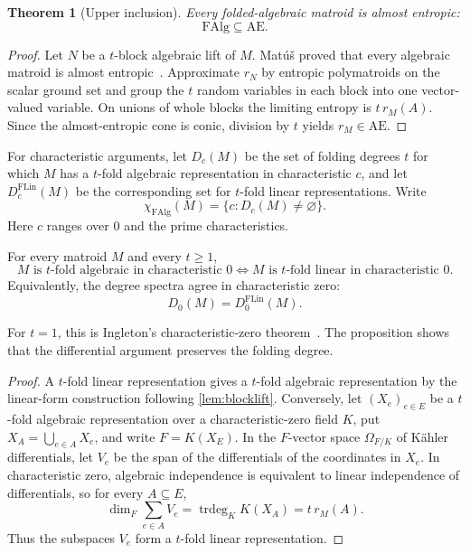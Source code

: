 \documentclass[11pt]{article}
\newtheorem{theorem}{Theorem}[section]
\theoremstyle{definition}
\newcommand{\trdeg}{\operatorname{trdeg}}
\newcommand{\FAlg}{\mathrm{FAlg}}
\newcommand{\FLin}{\mathrm{FLin}}
\newcommand{\AlmostEnt}{\mathrm{AE}}
\begin{document}
\begin{theorem}[Upper inclusion]\label{thm:falg-ae}
Every folded-algebraic matroid is almost entropic:
\[
\FAlg\subseteq\AlmostEnt.
\]
\end{theorem}
\begin{proof}
Let $N$ be a $t$-block algebraic lift of $M$.  Mat\'u\v{s} proved that every algebraic matroid is almost entropic~\cite{Matus2024}.  Approximate $r_N$ by entropic polymatroids on the scalar ground set and group the $t$ random variables in each block into one vector-valued variable.  On unions of whole blocks the limiting entropy is $t\,r_M(A)$.  Since the almost-entropic cone is conic, division by $t$ yields $r_M\in\AlmostEnt$.
\end{proof}

For characteristic arguments, let $D_c(M)$ be the set of folding degrees $t$ for which $M$ has a $t$-fold algebraic representation in characteristic $c$, and let $D_c^{\FLin}(M)$ be the corresponding set for $t$-fold linear representations.  Write
\[
\chi_{\FAlg}(M)=\{c:D_c(M)\ne\varnothing\}.
\]
Here $c$ ranges over $0$ and the prime characteristics.

\begin{proposition}\label{prop:charzero}
For every matroid $M$ and every $t\ge1$,
\[
M\text{ is $t$-fold algebraic in characteristic }0
\iff
M\text{ is $t$-fold linear in characteristic }0.
\]
Equivalently, the degree spectra agree in characteristic zero:
\[
D_0(M)=D^{\FLin}_0(M).
\]
\end{proposition}
For $t=1$, this is Ingleton's characteristic-zero theorem~\cite{Ingleton1971}.  The proposition shows that the differential argument preserves the folding degree.
\begin{proof}
A $t$-fold linear representation gives a $t$-fold algebraic representation by the linear-form construction following \cref{lem:blocklift}.  Conversely, let $(X_e)_{e\in E}$ be a $t$-fold algebraic representation over a characteristic-zero field $K$, put $X_A=\bigcup_{e\in A}X_e$, and write $F=K(X_E)$.  In the $F$-vector space $\Omega_{F/K}$ of K\"ahler differentials, let $V_e$ be the span of the differentials of the coordinates in $X_e$.  In characteristic zero, algebraic independence is equivalent to linear independence of differentials, so for every $A\subseteq E$,
\[
\dim_F\sum_{e\in A}V_e=\trdeg_K K(X_A)=t\,r_M(A).
\]
Thus the subspaces $V_e$ form a $t$-fold linear representation.
\end{proof}
\end{document}
